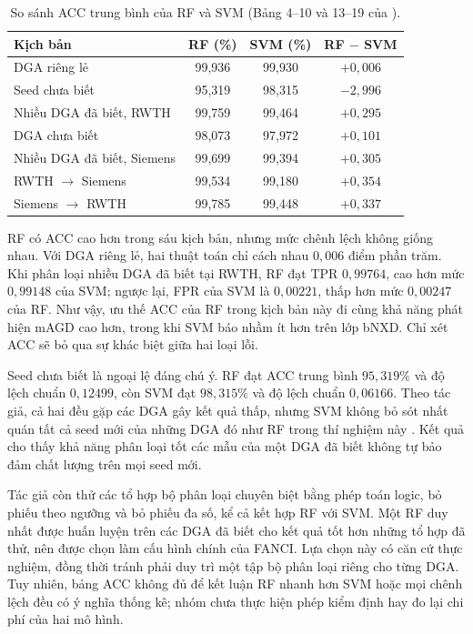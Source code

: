 \begin{table}[H]
\centering
\caption{So sánh ACC trung bình của RF và SVM (Bảng 4--10 và 13--19 của \cite{schuppen2018fanci}).}
\label{tab:c5-rf-svm}
\begin{tabularx}{\textwidth}{|>{\raggedright\arraybackslash}X|c|c|c|}
\hline
\rowcolor{LightCyan}
\textbf{Kịch bản} & \textbf{RF (\%)} & \textbf{SVM (\%)} & \textbf{RF $-$ SVM} \\ \hline
DGA riêng lẻ & 99,936 & 99,930 & $+0{,}006$ \\ \hline
Seed chưa biết & 95,319 & 98,315 & $-2{,}996$ \\ \hline
Nhiều DGA đã biết, RWTH & 99,759 & 99,464 & $+0{,}295$ \\ \hline
DGA chưa biết & 98,073 & 97,972 & $+0{,}101$ \\ \hline
Nhiều DGA đã biết, Siemens & 99,699 & 99,394 & $+0{,}305$ \\ \hline
RWTH $\rightarrow$ Siemens & 99,534 & 99,180 & $+0{,}354$ \\ \hline
Siemens $\rightarrow$ RWTH & 99,785 & 99,448 & $+0{,}337$ \\ \hline
\end{tabularx}
\end{table}

RF có ACC cao hơn trong sáu kịch bản, nhưng mức chênh lệch không giống nhau. Với DGA riêng lẻ, hai thuật toán chỉ cách nhau $0{,}006$ điểm phần trăm. Khi phân loại nhiều DGA đã biết tại RWTH, RF đạt TPR $0{,}99764$, cao hơn mức $0{,}99148$ của SVM; ngược lại, FPR của SVM là $0{,}00221$, thấp hơn mức $0{,}00247$ của RF. Như vậy, ưu thế ACC của RF trong kịch bản này đi cùng khả năng phát hiện mAGD cao hơn, trong khi SVM báo nhầm ít hơn trên lớp bNXD. Chỉ xét ACC sẽ bỏ qua sự khác biệt giữa hai loại lỗi.

Seed chưa biết là ngoại lệ đáng chú ý. RF đạt ACC trung bình $95{,}319\%$ và độ lệch chuẩn $0{,}12499$, còn SVM đạt $98{,}315\%$ và độ lệch chuẩn $0{,}06166$. Theo tác giả, cả hai đều gặp các DGA gây kết quả thấp, nhưng SVM không bỏ sót nhất quán tất cả seed mới của những DGA đó như RF trong thí nghiệm này \cite{schuppen2018fanci}. Kết quả cho thấy khả năng phân loại tốt các mẫu của một DGA đã biết không tự bảo đảm chất lượng trên mọi seed mới.

Tác giả còn thử các tổ hợp bộ phân loại chuyên biệt bằng phép toán logic, bỏ phiếu theo ngưỡng và bỏ phiếu đa số, kể cả kết hợp RF với SVM. Một RF duy nhất được huấn luyện trên các DGA đã biết cho kết quả tốt hơn những tổ hợp đã thử, nên được chọn làm cấu hình chính của FANCI. Lựa chọn này có căn cứ thực nghiệm, đồng thời tránh phải duy trì một tập bộ phân loại riêng cho từng DGA. Tuy nhiên, bảng ACC không đủ để kết luận RF nhanh hơn SVM hoặc mọi chênh lệch đều có ý nghĩa thống kê; nhóm chưa thực hiện phép kiểm định hay đo lại chi phí của hai mô hình.

